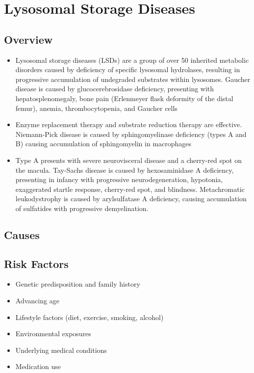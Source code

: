 \chapter{Lysosomal Storage Diseases}
\label{sec:Lysosomal Storage Diseases}

\section{Overview}


\begin{itemize}[noitemsep]
  \item Lysosomal storage diseases (LSDs) are a group of over 50 inherited metabolic disorders caused by deficiency of specific lysosomal hydrolases, resulting in progressive accumulation of undegraded substrates within lysosomes. Gaucher disease is caused by glucocerebrosidase deficiency, presenting with hepatosplenomegaly, bone pain (Erlenmeyer flask deformity of the distal femur), anemia, thrombocytopenia, and Gaucher cells
  \item Enzyme replacement therapy and substrate reduction therapy are effective. Niemann-Pick disease is caused by sphingomyelinase deficiency (types A and B) causing accumulation of sphingomyelin in macrophages
  \item Type A presents with severe neurovisceral disease and a cherry-red spot on the macula. Tay-Sachs disease is caused by hexosaminidase A deficiency, presenting in infancy with progressive neurodegeneration, hypotonia, exaggerated startle response, cherry-red spot, and blindness. Metachromatic leukodystrophy is caused by arylsulfatase A deficiency, causing accumulation of sulfatides with progressive demyelination.
\end{itemize}
\section{Causes}
\section{Risk Factors}

\begin{itemize}[noitemsep]
  \item Genetic predisposition and family history
  \item Advancing age
  \item Lifestyle factors (diet, exercise, smoking, alcohol)
  \item Environmental exposures
  \item Underlying medical conditions
  \item Medication use
\end{itemize}
